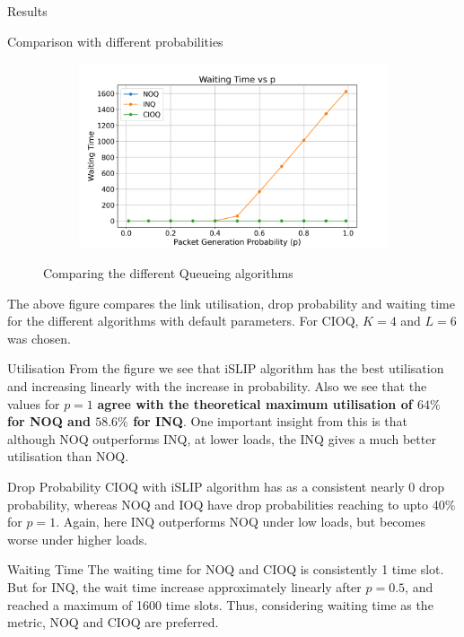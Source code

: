 \begin{section}{Results}
\begin{subsection}{Comparison with different probabilities}
\begin{figure}[h!]
\begin{subfigure}[b]{0.45\textwidth}
            \includegraphics[width=\textwidth]{figures/fig1/fig1c.png}
        \end{subfigure}
        
        \caption{Comparing the different Queueing algorithms}
        \label{fig:combined}
    \end{figure}

    The above figure compares the link utilisation, drop probability and waiting time for the different algorithms with default parameters. For CIOQ, $K=4$ and $L=6$ was chosen. 
    \begin{subsubsection}{Utilisation}
        From the figure we see that iSLIP algorithm has the best utilisation and increasing linearly with the increase in probability. Also we see that the values for $p=1$ \textbf{agree with the theoretical maximum utilisation of $64\%$ for NOQ and $58.6\%$ for INQ}.
        One important insight from this is that although NOQ outperforms INQ, at lower loads, the INQ gives a much better utilisation than NOQ. 
    \end{subsubsection}

    \begin{subsubsection}{Drop Probability}
        CIOQ with iSLIP algorithm has as a consistent nearly 0 drop probability, whereas NOQ and IOQ have drop probabilities reaching to upto 40\% for $p=1$. Again, here INQ outperforms NOQ under low loads, but becomes worse under higher loads.
    \end{subsubsection}

    \begin{subsubsection}{Waiting Time}
    The waiting time for NOQ and CIOQ is consistently 1 time slot. But for INQ, the wait time increase approximately linearly after $p=0.5$, and reached a maximum of 1600 time slots. Thus, considering waiting time as the metric, NOQ and CIOQ are preferred.
    \end{subsubsection}


\end{subsection}
\end{section}
